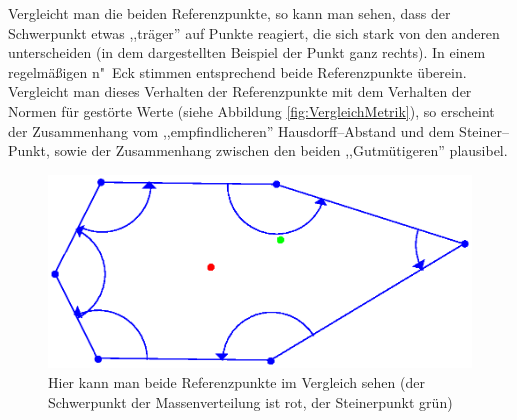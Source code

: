 Vergleicht man die beiden Referenzpunkte, so kann man sehen, dass der Schwerpunkt etwas ,,träger'' auf Punkte reagiert, die sich stark von den anderen unterscheiden (in dem dargestellten Beispiel der Punkt ganz rechts). In einem regelmäßigen n"~Eck stimmen entsprechend beide Referenzpunkte überein. Vergleicht man dieses Verhalten der Referenzpunkte mit dem Verhalten der Normen für gestörte Werte (siehe Abbildung \ref{fig:VergleichMetrik}), so erscheint der Zusammenhang vom ,,empfindlicheren'' Hausdorff--Abstand und dem  Steiner--Punkt, sowie der Zusammenhang zwischen den beiden ,,Gutmütigeren'' plausibel.

\begin{figure}
	\centering
	\includegraphics[scale=.8]{Referenzpunkte.eps}
	\caption[Vergleich beider Referenzpunkte]{Hier kann man beide Referenzpunkte im Vergleich sehen (der Schwerpunkt der Massenverteilung ist rot, der Steinerpunkt grün) }
	\label{fig:Referenzpunkte}
\end{figure}


